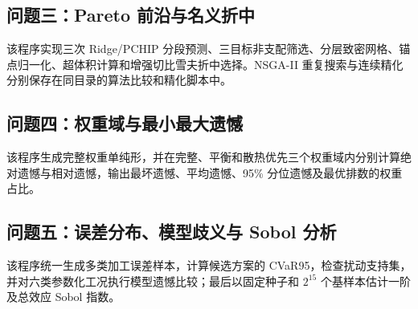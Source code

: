 \documentclass[12pt,a4paper]{article}
\begin{document}
\begin{appendices}
\subsection{问题三：Pareto 前沿与名义折中}
该程序实现三次 Ridge/PCHIP 分段预测、三目标非支配筛选、分层致密网格、锚点归一化、超体积计算和增强切比雪夫折中选择。NSGA-II 重复搜索与连续精化分别保存在同目录的算法比较和精化脚本中。


\subsection{问题四：权重域与最小最大遗憾}
该程序生成完整权重单纯形，并在完整、平衡和散热优先三个权重域内分别计算绝对遗憾与相对遗憾，输出最坏遗憾、平均遗憾、95\% 分位遗憾及最优排数的权重占比。


\subsection{问题五：误差分布、模型歧义与 Sobol 分析}
该程序统一生成多类加工误差样本，计算候选方案的 CVaR95，检查扰动支持集，并对六类参数化工况执行模型遗憾比较；最后以固定种子和 $2^{15}$ 个基样本估计一阶及总效应 Sobol 指数。

\endgroup

\end{appendices}
\end{document}
